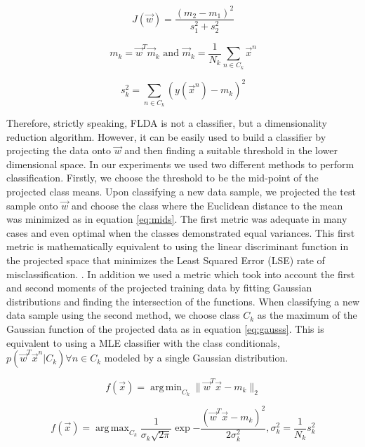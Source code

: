\documentclass[journal]{IEEEtran}
\DeclareMathOperator*{\argmax}{arg\,max}
\DeclareMathOperator*{\argmin}{arg\,min}
\begin{document}
\begin{equation}
\label{eq:flda_2}
J(\vec{w}) = \frac{(m_2-m_1)^2}{s_1^2+s_2^2}
\end{equation}

\begin{equation}
\label{eq:flda_mean}
m_k = \vec{w}^T\vec{m}_k \text{      and       } \vec{m}_k = \frac{1}{N_k}\sum_{n \in C_k}{\vec{x}^n}
\end{equation}

\begin{equation}
\label{eq:flda_scatter}
s_k^2 = \sum_{n \in C_k}{(y(\vec{x}^n) - m_k)^2}
\end{equation}

\par Therefore, strictly speaking, FLDA is not a classifier, but a dimensionality reduction algorithm. However, it can be easily used to build a classifier by projecting the data onto \(\vec{w}\) and then finding a suitable threshold in the lower dimensional space. In our experiments we used two different methods to perform classification. Firstly, we choose the threshold to be the mid-point of the projected class means. Upon classifying a new data sample, we projected the test sample onto \(\vec{w}\) and choose the class where the Euclidean distance to the mean was minimized as in equation \ref{eq:mids}. The first metric was adequate in many cases and even optimal when the classes demonstrated equal variances. This first metric is mathematically equivalent to using the linear discriminant function in the projected space that minimizes the Least Squared Error (LSE) rate of misclassification. \cite[p.~189-190]{bishop2}. In addition we used a metric which took into account the first and second moments of the projected training data by fitting Gaussian distributions and finding the intersection of the functions. When classifying a new data sample using the second method, we choose class \(C_k\) as the maximum of the Gaussian function of the projected data as in equation \ref{eq:gausss}. This is equivalent to using a MLE classifier with the class conditionals, \(p(\vec{w}^T\vec{x}^n|C_k) \forall n \in C_k\) modeled by a single Gaussian distribution.

\begin{equation}
\label{eq:mids}
f(\vec{x}) = \argmin_{C_k}\| \vec{w}^T\vec{x} - m_k \|_2
\end{equation}

\begin{equation}
\label{eq:gausss}
f(\vec{x}) = \argmax_{C_k}\frac{1}{\sigma_k\sqrt{2\pi}}\exp{-\frac{(\vec{w}^T\vec{x} - m_k)^2}{2\sigma_k^2}}, \sigma_k^2 = \frac{1}{N_k}s_k^2
\end{equation}
\end{document}
